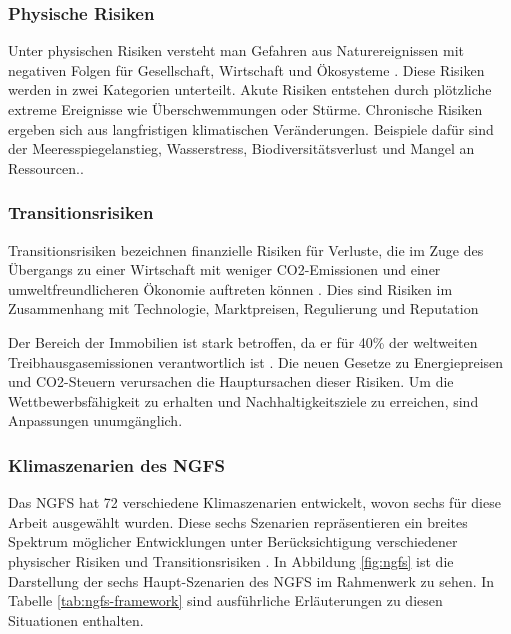 \subsubsection{Physische Risiken}
Unter physischen Risiken versteht man Gefahren aus Naturereignissen mit negativen Folgen für Gesellschaft, Wirtschaft und Ökosysteme \parencite{greenvisionsolutions_transitorische_2024}. Diese Risiken werden in zwei Kategorien unterteilt. Akute Risiken entstehen durch plötzliche extreme Ereignisse wie Überschwemmungen oder Stürme. Chronische Risiken ergeben sich aus langfristigen klimatischen Veränderungen. Beispiele dafür sind der Meeresspiegelanstieg, Wasserstress, Biodiversitätsverlust und Mangel an Ressourcen.\parencite{dnb2019values}.
\subsubsection{Transitionsrisiken}
Transitionsrisiken bezeichnen finanzielle Risiken für Verluste, die im Zuge des Übergangs zu einer Wirtschaft mit weniger CO2-Emissionen und einer umweltfreundlicheren Ökonomie auftreten können \parencite{ecb2020climate}. Dies sind Risiken im Zusammenhang mit Technologie, Marktpreisen, Regulierung und Reputation

Der Bereich der Immobilien ist stark betroffen, da er für 40\% der weltweiten Treibhausgasemissionen verantwortlich ist \parencite{unepfi2023realestate}. Die neuen Gesetze zu Energiepreisen und CO2-Steuern verursachen die Hauptursachen dieser Risiken. Um die Wettbewerbsfähigkeit zu erhalten und Nachhaltigkeitsziele zu erreichen, sind Anpassungen unumgänglich.


\subsubsection{Klimaszenarien des NGFS}\label{sec:ngfs}
Das \ac{NGFS} hat 72 verschiedene Klimaszenarien entwickelt, wovon sechs für diese Arbeit ausgewählt wurden. Diese sechs Szenarien repräsentieren ein breites Spektrum möglicher Entwicklungen unter Berücksichtigung verschiedener physischer Risiken und Transitionsrisiken \parencite{NGFS2021}. In Abbildung \ref{fig:ngfs} ist die Darstellung der sechs Haupt-Szenarien des NGFS im Rahmenwerk zu sehen. In Tabelle \ref{tab:ngfs-framework} sind ausführliche Erläuterungen zu diesen Situationen enthalten.

